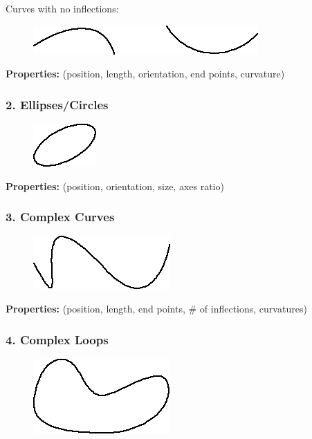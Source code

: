 Curves with no inflections:

\begin{figure}[H]
\centering
\includegraphics[scale=0.7]{CurvesClasses.PNG}
\end{figure}

\textbf{Properties:} (position, length, orientation, end points, curvature)

\subsubsection{2. Ellipses/Circles}

\begin{figure}[H]
\centering
\includegraphics[scale=0.7]{EllipsesClasses.PNG}
\end{figure}

\textbf{Properties:} (position, orientation, size, axes ratio)

\subsubsection{3. Complex Curves}

\begin{figure}[H]
\centering
\includegraphics[scale=0.7]{ComplexCurves.PNG}
\end{figure}

\textbf{Properties:} (position, length, end points, \# of inflections, curvatures) 

\subsubsection{4. Complex Loops}

\begin{figure}[H]
\centering
\includegraphics[scale=0.75]{ComplexLoops.PNG}
\end{figure}

